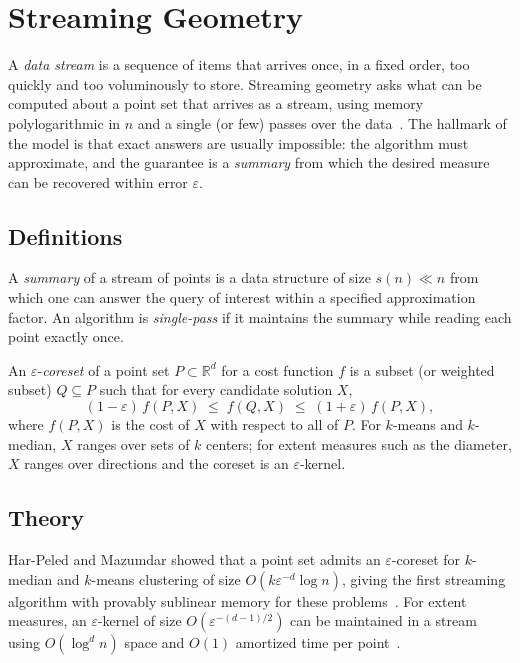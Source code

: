 \section{Streaming Geometry}
\label{sec:frontiers_streaming}

A \emph{data stream} is a sequence of items that
arrives once, in a fixed order, too quickly and too voluminously to store.
Streaming geometry asks what can be computed about a point set that arrives as
a stream, using memory polylogarithmic in $n$ and a single (or few) passes over
the data~\cite{muthukrishnan2005}. The hallmark of the model is that exact
answers are usually impossible: the algorithm must approximate, and the
guarantee is a \emph{summary} from which the desired measure can be recovered
within error $\varepsilon$.

\subsection{Definitions}

\begin{definition}\label{def:frontiers_stream}
A \emph{summary} of a stream of points is a data structure of size $s(n) \ll
n$ from which one can answer the query of interest within a specified
approximation factor. An algorithm is \emph{single-pass} if it maintains the
summary while reading each point exactly once.
\end{definition}

\begin{definition}\label{def:frontiers_coreset}
An $\varepsilon$-\emph{coreset} of a point set $P \subset \mathbb{R}^d$ for a
cost function $f$ is a subset (or weighted subset) $Q \subseteq P$ such that
for every candidate solution $X$,
\[
(1 - \varepsilon)\, f(P,X) \;\le\; f(Q,X) \;\le\; (1 + \varepsilon)\, f(P,X),
\]
where $f(P,X)$ is the cost of $X$ with respect to all of $P$. For $k$-means
and $k$-median, $X$ ranges over sets of $k$ centers; for extent measures such
as the diameter, $X$ ranges over directions and the coreset is an
$\varepsilon$-kernel.
\end{definition}

\subsection{Theory}

Har-Peled and Mazumdar showed that a point set admits an
$\varepsilon$-coreset for $k$-median and $k$-means clustering of size
$O(k \varepsilon^{-d} \log n)$, giving the first streaming algorithm with
provably sublinear memory for these problems~\cite{harpeled2004}. For extent
measures, an $\varepsilon$-kernel of size $O(\varepsilon^{-(d-1)/2})$ can be
maintained in a stream using $O(\log^d n)$ space and $O(1)$ amortized time per
point~\cite{agarwal2001extent}.

